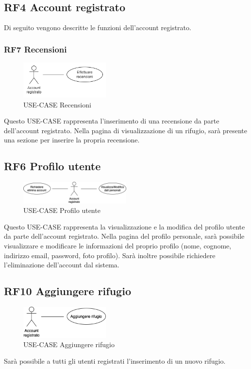 \documentclass[a4paper,12pt]{article}
\begin{document}
\subsection*{RF4 Account registrato}

Di seguito vengono descritte le funzioni dell'account registrato.

\subsubsection*{RF7 Recensioni}
\begin{figure}[H]
   \centering
   \includegraphics[width=0.4\textwidth]{img-D2/recensioni_registrato.png}
    \caption{USE-CASE Recensioni}
\end{figure}

Questo USE-CASE rappresenta l'inserimento di una recensione da parte dell'account registrato.
Nella pagina di visualizzazione di un rifugio, sarà presente una sezione per inserire la propria recensione.
 
\subsection*{RF6 Profilo utente}
\begin{figure}[H]
   \centering   \includegraphics[width=0.5\textwidth]{img-D2/profilo_utente.png}
    \caption{USE-CASE Profilo utente}
\end{figure}

Questo USE-CASE rappresenta la visualizzazione e la modifica del profilo utente da parte dell'account registrato.
Nella pagina del profilo personale, sarà possibile visualizzare e modificare le informazioni del proprio profilo (nome, cognome, indirizzo email, password, foto profilo).
Sarà inoltre possibile richiedere l'eliminazione dell'account dal sistema. 


\subsection*{RF10 Aggiungere rifugio}
\begin{figure}[H]
   \centering   \includegraphics[width=0.4\textwidth]{img-D2/aggiungere_rifugio.png}
    \caption{USE-CASE Aggiungere rifugio}
\end{figure}
Sarà possibile a tutti gli utenti registrati l'inserimento di un nuovo rifugio.
\end{document}
